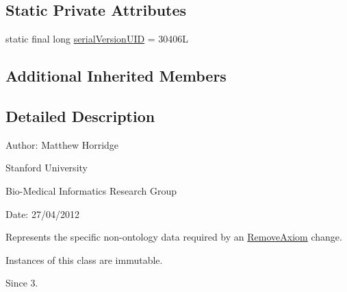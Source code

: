 \subsection*{Static Private Attributes}
\begin{DoxyCompactItemize}
\item 
static final long \hyperlink{classorg_1_1semanticweb_1_1owlapi_1_1change_1_1_remove_axiom_data_a85bd6b9609dad15b233194f445251066}{serial\-Version\-U\-I\-D} = 30406\-L
\end{DoxyCompactItemize}
\subsection*{Additional Inherited Members}


\subsection{Detailed Description}
Author\-: Matthew Horridge\par
 Stanford University\par
 Bio-\/\-Medical Informatics Research Group\par
 Date\-: 27/04/2012 

Represents the specific non-\/ontology data required by an \hyperlink{}{Remove\-Axiom} change. 

Instances of this class are immutable. 

\begin{DoxySince}{Since}
3. 
\end{DoxySince}


